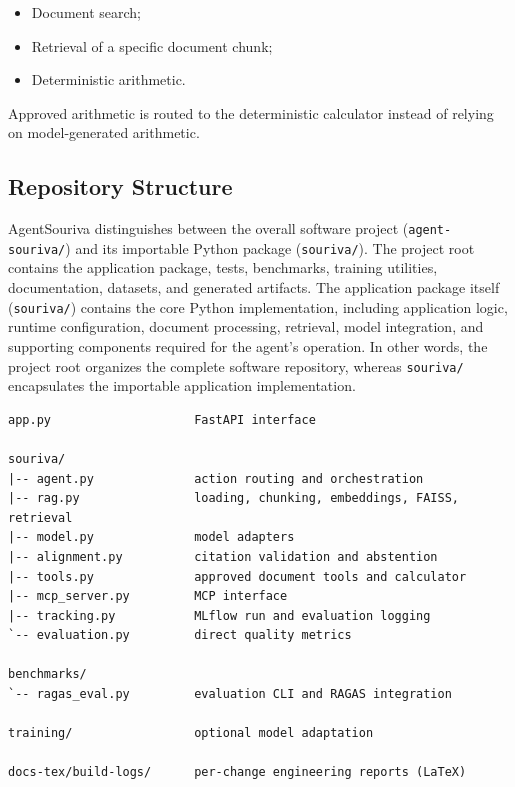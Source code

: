 \begin{itemize}
\tightlist
\item
  Document search;
\item
  Retrieval of a specific document chunk;
\item
  Deterministic arithmetic.
\end{itemize}

Approved arithmetic is routed to the deterministic calculator instead of relying on model-generated arithmetic.

\subsection{Repository Structure}

AgentSouriva distinguishes between the overall software project
(\texttt{agent-souriva/}) and its importable Python package
(\texttt{souriva/}). The project root contains the application
package, tests, benchmarks, training utilities, documentation,
datasets, and generated artifacts. The application package itself (\texttt{souriva/}) contains the core Python implementation, including application logic, runtime configuration, document processing, retrieval, model integration, and supporting components required for the agent's operation. In other words, the project root organizes the complete software
repository, whereas \texttt{souriva/} encapsulates the importable
application implementation.



\begin{verbatim}
app.py                    FastAPI interface

souriva/
|-- agent.py              action routing and orchestration
|-- rag.py                loading, chunking, embeddings, FAISS, retrieval
|-- model.py              model adapters
|-- alignment.py          citation validation and abstention
|-- tools.py              approved document tools and calculator
|-- mcp_server.py         MCP interface
|-- tracking.py           MLflow run and evaluation logging
`-- evaluation.py         direct quality metrics

benchmarks/
`-- ragas_eval.py         evaluation CLI and RAGAS integration

training/                 optional model adaptation

docs-tex/build-logs/      per-change engineering reports (LaTeX)
\end{verbatim}

